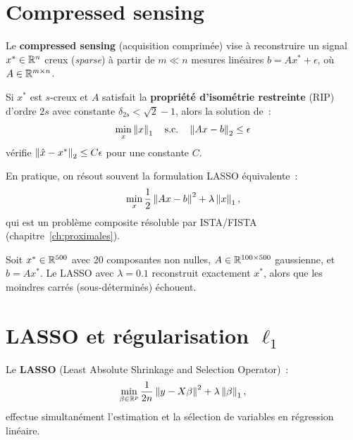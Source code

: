 \section{Compressed sensing}

\begin{definition}
Le \textbf{compressed sensing} (acquisition comprim\'ee) vise \`a reconstruire
un signal $x^* \in \mathbb{R}^n$ creux (\emph{sparse}) \`a partir de $m \ll n$
mesures lin\'eaires $b = Ax^* + \epsilon$, o\`u $A \in \mathbb{R}^{m \times n}$.
\end{definition}

\begin{theoreme}
Si $x^*$ est $s$-creux et $A$ satisfait la \textbf{propri\'et\'e d'isom\'etrie
restreinte} (RIP) d'ordre $2s$ avec constante $\delta_{2s} < \sqrt{2} - 1$,
alors la solution de~:
\[
  \min_x \left\| x \right\|_1 \quad \text{s.c.} \quad \left\| Ax - b \right\|_2 \leq \epsilon
\]
v\'erifie $\left\| \hat{x} - x^* \right\|_2 \leq C \epsilon$ pour une constante $C$.
\end{theoreme}

\begin{remarque}
En pratique, on r\'esout souvent la formulation LASSO \'equivalente~:
\[
  \min_x \frac{1}{2} \left\| Ax - b \right\|^2 + \lambda \left\| x \right\|_1,
\]
qui est un probl\`eme composite r\'esoluble par ISTA/FISTA
(chapitre~\ref{ch:proximales}).
\end{remarque}

\begin{exemple}
Soit $x^* \in \mathbb{R}^{500}$ avec 20 composantes non nulles, $A \in \mathbb{R}^{100 \times 500}$
gaussienne, et $b = Ax^*$. Le LASSO avec $\lambda = 0.1$ reconstruit
exactement $x^*$, alors que les moindres carr\'es (sous-d\'etermin\'es)
\'echouent.
\end{exemple}

\section{LASSO et r\'egularisation $\ell_1$}

\begin{definition}[LASSO]
Le \textbf{LASSO} (Least Absolute Shrinkage and Selection Operator)~:
\[
  \min_{\beta \in \mathbb{R}^p} \frac{1}{2n} \left\| y - X\beta \right\|^2
  + \lambda \left\| \beta \right\|_1,
\]
effectue simultan\'ement l'estimation et la s\'election de variables en
r\'egression lin\'eaire.
\end{definition}

